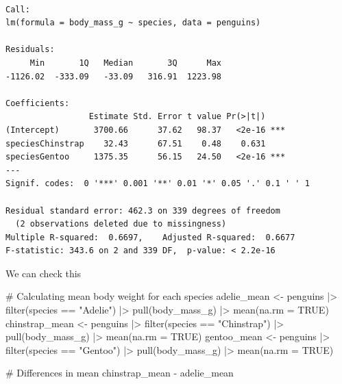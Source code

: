 \documentclass[
  letterpaper,
  DIV=11,
  numbers=noendperiod]{scrreprt}
\newenvironment{Shaded}{\begin{snugshade}}{\end{snugshade}}
\newcommand{\AttributeTok}[1]{\textcolor[rgb]{0.40,0.45,0.13}{#1}}
\newcommand{\CommentTok}[1]{\textcolor[rgb]{0.37,0.37,0.37}{#1}}
\newcommand{\ConstantTok}[1]{\textcolor[rgb]{0.56,0.35,0.01}{#1}}
\newcommand{\FunctionTok}[1]{\textcolor[rgb]{0.28,0.35,0.67}{#1}}
\newcommand{\NormalTok}[1]{\textcolor[rgb]{0.00,0.23,0.31}{#1}}
\newcommand{\OtherTok}[1]{\textcolor[rgb]{0.00,0.23,0.31}{#1}}
\newcommand{\SpecialCharTok}[1]{\textcolor[rgb]{0.37,0.37,0.37}{#1}}
\newcommand{\StringTok}[1]{\textcolor[rgb]{0.13,0.47,0.30}{#1}}
\begin{document}
\begin{verbatim}

Call:
lm(formula = body_mass_g ~ species, data = penguins)

Residuals:
     Min       1Q   Median       3Q      Max 
-1126.02  -333.09   -33.09   316.91  1223.98 

Coefficients:
                 Estimate Std. Error t value Pr(>|t|)    
(Intercept)       3700.66      37.62   98.37   <2e-16 ***
speciesChinstrap    32.43      67.51    0.48    0.631    
speciesGentoo     1375.35      56.15   24.50   <2e-16 ***
---
Signif. codes:  0 '***' 0.001 '**' 0.01 '*' 0.05 '.' 0.1 ' ' 1

Residual standard error: 462.3 on 339 degrees of freedom
  (2 observations deleted due to missingness)
Multiple R-squared:  0.6697,    Adjusted R-squared:  0.6677 
F-statistic: 343.6 on 2 and 339 DF,  p-value: < 2.2e-16
\end{verbatim}

We can check this

\begin{Shaded}
\begin{Highlighting}[]
\CommentTok{\# Calculating mean body weight for each species}
\NormalTok{adelie\_mean }\OtherTok{\textless{}{-}}\NormalTok{ penguins }\SpecialCharTok{|\textgreater{}} 
  \FunctionTok{filter}\NormalTok{(species }\SpecialCharTok{==} \StringTok{"Adelie"}\NormalTok{) }\SpecialCharTok{|\textgreater{}} 
  \FunctionTok{pull}\NormalTok{(body\_mass\_g) }\SpecialCharTok{|\textgreater{}}
  \FunctionTok{mean}\NormalTok{(}\AttributeTok{na.rm =} \ConstantTok{TRUE}\NormalTok{)}
\NormalTok{chinstrap\_mean }\OtherTok{\textless{}{-}}\NormalTok{ penguins }\SpecialCharTok{|\textgreater{}} 
  \FunctionTok{filter}\NormalTok{(species }\SpecialCharTok{==} \StringTok{"Chinstrap"}\NormalTok{) }\SpecialCharTok{|\textgreater{}} 
  \FunctionTok{pull}\NormalTok{(body\_mass\_g) }\SpecialCharTok{|\textgreater{}}
  \FunctionTok{mean}\NormalTok{(}\AttributeTok{na.rm =} \ConstantTok{TRUE}\NormalTok{)}
\NormalTok{gentoo\_mean }\OtherTok{\textless{}{-}}\NormalTok{ penguins }\SpecialCharTok{|\textgreater{}} 
  \FunctionTok{filter}\NormalTok{(species }\SpecialCharTok{==} \StringTok{"Gentoo"}\NormalTok{) }\SpecialCharTok{|\textgreater{}} 
  \FunctionTok{pull}\NormalTok{(body\_mass\_g) }\SpecialCharTok{|\textgreater{}}
  \FunctionTok{mean}\NormalTok{(}\AttributeTok{na.rm =} \ConstantTok{TRUE}\NormalTok{)}

 \CommentTok{\# Differences in mean}
\NormalTok{chinstrap\_mean }\SpecialCharTok{{-}}\NormalTok{ adelie\_mean}
\end{Highlighting}
\end{Shaded}
\end{document}
